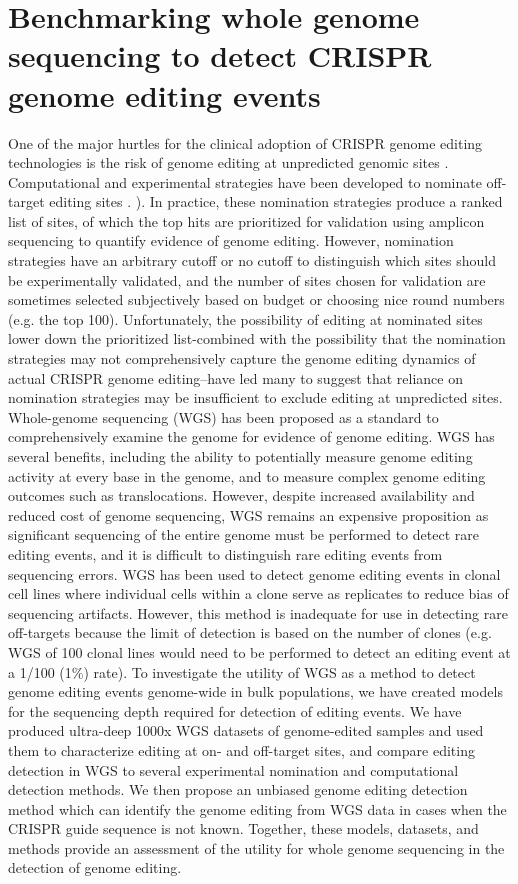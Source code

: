 \documentclass[a4paper, titlepage, openright]{book}
\begin{document}
\section{Benchmarking whole genome sequencing to detect CRISPR genome editing events}
One of the major hurtles for the clinical adoption of CRISPR genome editing technologies is the risk of genome editing at unpredicted genomic sites \citep{fu2013high}. Computational and experimental strategies have been developed to nominate off-target editing sites \citep{clement2020technologies}. ). In practice, these nomination strategies produce a ranked list of sites, of which the top hits are prioritized for validation using amplicon sequencing to quantify evidence of genome editing\citep{akcakaya2018vivo}. However, nomination strategies have an arbitrary cutoff or no cutoff to distinguish which sites should be experimentally validated, and the number of sites chosen for validation are sometimes selected subjectively based on budget or choosing nice round numbers (e.g. the top 100). Unfortunately, the possibility of editing at nominated sites lower down the prioritized list-combined with the possibility that the nomination strategies may not comprehensively capture the genome editing dynamics of actual CRISPR genome editing–have led many to suggest that reliance on nomination strategies may be insufficient to exclude editing at unpredicted sites.  Whole-genome sequencing (WGS) has been proposed as a standard to comprehensively examine the genome for evidence of genome editing. WGS has several benefits, including the ability to potentially measure genome editing activity at every base in the genome, and to measure complex genome editing outcomes such as translocations. However, despite increased availability and reduced cost of genome sequencing, WGS remains an expensive proposition as significant sequencing of the entire genome must be performed to detect rare editing events, and it is difficult to distinguish rare editing events from sequencing errors. WGS has been used to detect genome editing events in clonal cell lines \citep{smith2014whole, veres2014low} where individual cells within a clone serve as replicates to reduce bias of sequencing artifacts. However, this method is inadequate for use in detecting rare off-targets because the limit of detection is based on the number of clones (e.g. WGS of 100 clonal lines would need to be performed to detect an editing event at a 1/100 (1\%) rate). 
To investigate the utility of WGS as a method to detect genome editing events genome-wide in bulk populations, we have created models for the sequencing depth required for detection of editing events. We have produced ultra-deep 1000x WGS datasets of genome-edited samples and used them to characterize editing at on- and off-target sites, and compare editing detection in WGS to several experimental nomination and computational detection methods. We then propose an unbiased genome editing detection method which can identify the genome editing from WGS data in cases when the CRISPR guide sequence is not known. Together, these models, datasets, and methods provide an assessment of the utility for whole genome sequencing in the detection of genome editing. 
\end{document}
